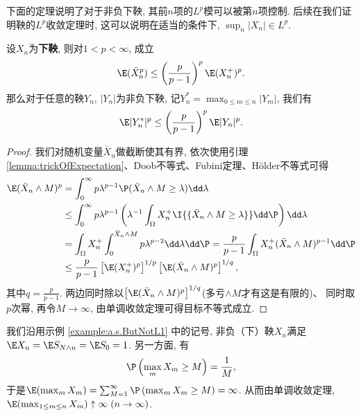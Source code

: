 \documentclass[a4paper, 10pt]{ctexart}
\begin{document}
下面的定理说明了对于非负下鞅, 其前$n$项的$L^p$模可以被第$n$项控制. 后续在我们证明鞅的$L^p$收敛定理时, 这可以说明在适当的条件下, $\sup_n |X_n| \in L^p$. 
\begin{theorem}[$L^p$最大值不等式]\label{thm:LpMax}	
	设$X_n$为\textbf{下鞅}, 则对$1 < p < \infty$, 成立
	\begin{equation*}
		\E(\bar X_n^p) \leq \left( \frac{p}{p-1} \right)^p \E(X_n^+)^p. 
	\end{equation*}
	那么对于任意的鞅$Y_n$, $|Y_n|$为非负下鞅, 记$Y_n^* = \max_{0 \leq m \leq n} |Y_m|$, 我们有
	\begin{equation*}
		\E|Y_n^*|^p \leq \left( \frac{p}{p-1} \right)^p \E|Y_n|^p. 
	\end{equation*}
\end{theorem}

\begin{proof}
	我们对随机变量$\bar X_n$做截断使其有界, 依次使用引理\ref{lemma:trickOfExpectation}、Doob不等式、Fubini定理、Hölder不等式可得
	\begin{align*}
		\E (\bar X_n \wedge M)^p
		&= \int_0^{\infty} p \lambda^{p-1} \P(\bar X_n \wedge M \geq \lambda) \dd \lambda \\
		&\leq \int_0^{\infty} p \lambda^{p-1}  \left( \lambda^{-1} \int_{\Omega} X_n^+ \I{\{\bar X_n \wedge M \geq \lambda\}} \dd \P \right) \dd \lambda \\
		&= \int_{\Omega} X_n^+ \int_0^{\bar X_n \wedge M} p \lambda^{p-2} \dd \lambda \dd \P 
		= \frac{p}{p-1} \int_{\Omega} X_n^+ (\bar X_n \wedge M)^{p-1} \dd \P \\
		&\leq \frac{p}{p-1} \left[ \E(X_n^+)^p \right]^{1/p} \left[ \E(\bar X_n \wedge M)^p \right]^{1/q}, 
	\end{align*}
	其中$q = \frac{p}{p-1}$. 
	两边同时除以$\left[ \E(\bar X_n \wedge M)^p \right]^{1/q}$(多亏$\wedge M$才有这是有限的)、 同时取$p$次幂, 再令$M \to \infty$, 由单调收敛定理可得目标不等式成立. 
\end{proof}


\begin{example}
	我们沿用示例 \ref{example:a.s.ButNotL1} 中的记号, 非负（下）鞅$X_n$满足$\E X_n = \E S_{N \wedge n} = \E S_0 = 1$. 
	另一方面, 有 
	\begin{equation*}
		\P \left( \max_m X_m \geq M \right) = \frac1M, 
	\end{equation*}
	于是$\E( \max_m X_m) = \sum_{M=1}^{\infty} \P \left( \max_m X_m \geq M \right) = \infty$. 
	从而由单调收敛定理, $\E (\max_{1 \leq m \leq n} X_m) \uparrow \infty\; (n \to \infty)$. 
\end{example}
\end{document}
